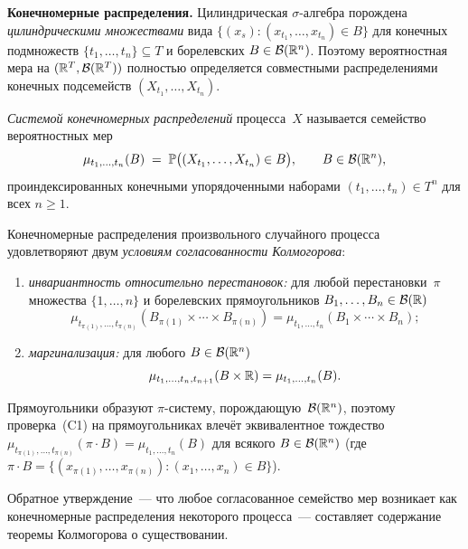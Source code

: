 \medskip
\noindent\textbf{Конечномерные распределения.} Цилиндрическая $\sigma$-алгебра порождена \emph{цилиндрическими множествами} вида $\{(x_s) : (x_{t_1}, \dots, x_{t_n}) \in B\}$ для конечных подмножеств $\{t_1, \dots, t_n\} \subseteq T$ и борелевских $B \in \mathcal{B}(\mathbb{R}^n)$. Поэтому вероятностная мера на $(\mathbb{R}^T, \mathcal{B}(\mathbb{R}^T))$ полностью определяется совместными распределениями конечных подсемейств $(X_{t_1}, \dots, X_{t_n})$.

\begin{definition}
\label{def:fdd}
\emph{Системой конечномерных распределений} процесса~$X$ называется семейство вероятностных мер
\[
  \mu_{t_1, \dots, t_n}(B) \;=\; \mathbb{P}\bigl((X_{t_1}, \dots, X_{t_n}) \in B\bigr), \qquad B \in \mathcal{B}(\mathbb{R}^n),
\]
проиндексированных конечными упорядоченными наборами $(t_1, \dots, t_n) \in T^n$ для всех $n \geq 1$.
\end{definition}

\begin{proposition}
\label{prop:fdd-consistency}
Конечномерные распределения произвольного случайного процесса удовлетворяют двум \emph{условиям согласованности Колмогорова}:
\begin{enumerate}[label=(C\arabic*)]
  \item \emph{инвариантность относительно перестановок:} для любой перестановки~$\pi$ множества $\{1, \dots, n\}$ и борелевских прямоугольников $B_1, \dots, B_n \in \mathcal{B}(\mathbb{R})$
        \[
          \mu_{t_{\pi(1)}, \dots, t_{\pi(n)}}(B_{\pi(1)} \times \cdots \times B_{\pi(n)}) = \mu_{t_1, \dots, t_n}(B_1 \times \cdots \times B_n);
        \]
  \item \emph{маргинализация:} для любого $B \in \mathcal{B}(\mathbb{R}^n)$
        \[
          \mu_{t_1, \dots, t_n, t_{n+1}}(B \times \mathbb{R}) = \mu_{t_1, \dots, t_n}(B).
        \]
\end{enumerate}
Прямоугольники образуют $\pi$-систему, порождающую~$\mathcal{B}(\mathbb{R}^n)$,
поэтому проверка~(C1) на прямоугольниках влечёт эквивалентное
тождество $\mu_{t_{\pi(1)}, \dots, t_{\pi(n)}}(\pi \cdot B) = \mu_{t_1, \dots, t_n}(B)$
для всякого $B \in \mathcal{B}(\mathbb{R}^n)$ (где
$\pi \cdot B = \{(x_{\pi(1)}, \dots, x_{\pi(n)}) : (x_1, \dots, x_n) \in B\}$).
\end{proposition}

Обратное утверждение~--- что любое согласованное семейство мер возникает как конечномерные распределения некоторого процесса~--- составляет содержание теоремы Колмогорова о существовании.

